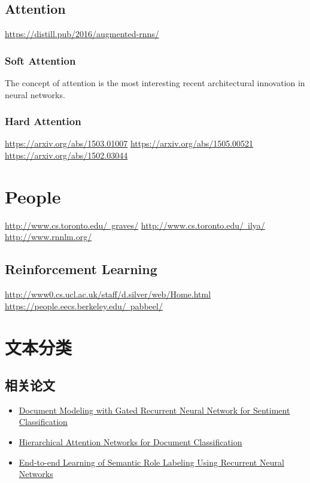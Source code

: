 \documentclass[UTF8,11pt,a4paper]{ctexart}
\begin{document}
\subsection{Attention}
\href{Attention and Augmented Recurrent Neural Networks}{https://distill.pub/2016/augmented-rnns/}

\subsubsection{Soft Attention}
The concept of attention is the most interesting recent architectural innovation in neural networks.

\subsubsection{Hard Attention}
\href{Inferring Algorithmic Patterns with Stack-Augmented Recurrent Nets}{https://arxiv.org/abs/1503.01007}
\href{Reinforcement Learning Neural Turing Machines - Revised}{https://arxiv.org/abs/1505.00521}
\href{Show, Attend and Tell: Neural Image Caption Generation with Visual Attention}{https://arxiv.org/abs/1502.03044}

\section{People}
\href{Alex Graves}{http://www.cs.toronto.edu/~graves/}
\href{Ilya Sutskever}{http://www.cs.toronto.edu/~ilya/}
\href{Tomas Mikolov}{http://www.rnnlm.org/}

\subsection{Reinforcement Learning}
\href{David Silver}{http://www0.cs.ucl.ac.uk/staff/d.silver/web/Home.html}
\href{Pieter Abbeel}{https://people.eecs.berkeley.edu/~pabbeel/}


\section{文本分类}
\subsection{相关论文}

\begin{itemize}
\item \href{http://www.aclweb.org/old_anthology/D/D15/D15-1167.pdf}{Document Modeling with Gated Recurrent Neural Network for Sentiment Classification}
\item \href{http://www.aclweb.org/anthology/N16-1174}{Hierarchical Attention Networks for Document Classification}
\item \href{http://www.aclweb.org/anthology/P15-1109}{End-to-end Learning of Semantic Role Labeling Using Recurrent Neural Networks}
\end{itemize}
\end{document}
